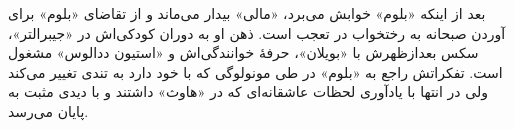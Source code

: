 \documentclass[12pt]{book}
\newcommand{\noun}[1]{«{#1}»}
\begin{document}
    بعد از اینکه \noun{بلوم} خوابش می‌برد، \noun{مالی} بیدار می‌ماند و از تقاضای \noun{بلوم} برای آوردن صبحانه به رختخواب در تعجب است. ذهن او به دوران کودکی‌اش در \noun{جیبرالتر}، سکس بعدازظهرش با \noun{بویلان}، حرفۀ خوانندگی‌اش و \noun{استیون ددالوس} مشغول است. تفکراتش راجع به \noun{بلوم} در طی مونولوگی که با خود دارد به تندی تغییر می‌کند ولی در انتها با یادآوری لحظات عاشقانه‌ای که در \noun{هاوث} داشتند و با دیدی مثبت به پایان می‌رسد.
\end{document}
